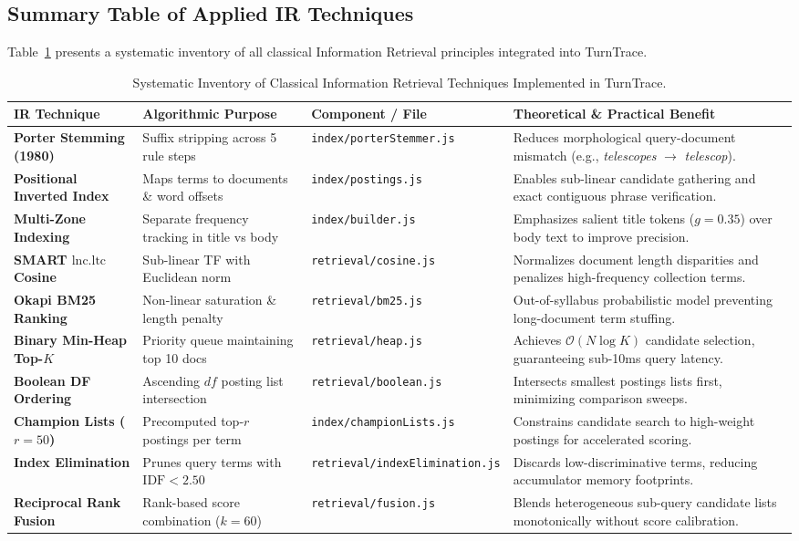 \documentclass[10pt,a4paper,twocolumn]{article}
\begin{document}
\subsection{Summary Table of Applied IR Techniques}
Table~\ref{tab:ir_techniques} presents a systematic inventory of all classical Information Retrieval principles integrated into TurnTrace.

\begin{table}[t]
\centering
\scriptsize
\caption{Systematic Inventory of Classical Information Retrieval Techniques Implemented in TurnTrace.}
\label{tab:ir_techniques}
\begin{tabularx}{\textwidth}{p{3.2cm} p{3.8cm} p{3.2cm} X}
\toprule
\textbf{IR Technique} & \textbf{Algorithmic Purpose} & \textbf{Component / File} & \textbf{Theoretical \& Practical Benefit} \\
\midrule
\textbf{Porter Stemming (1980)} & Suffix stripping across 5 rule steps & \texttt{index/porterStemmer.js} & Reduces morphological query-document mismatch (e.g., \textit{telescopes} $\to$ \textit{telescop}). \\
\textbf{Positional Inverted Index} & Maps terms to documents \& word offsets & \texttt{index/postings.js} & Enables sub-linear candidate gathering and exact contiguous phrase verification. \\
\textbf{Multi-Zone Indexing} & Separate frequency tracking in title vs body & \texttt{index/builder.js} & Emphasizes salient title tokens ($g=0.35$) over body text to improve precision. \\
\textbf{SMART $\text{lnc.ltc}$ Cosine} & Sub-linear TF with Euclidean norm & \texttt{retrieval/cosine.js} & Normalizes document length disparities and penalizes high-frequency collection terms. \\
\textbf{Okapi BM25 Ranking} & Non-linear saturation \& length penalty & \texttt{retrieval/bm25.js} & Out-of-syllabus probabilistic model preventing long-document term stuffing. \\
\textbf{Binary Min-Heap Top-$K$} & Priority queue maintaining top 10 docs & \texttt{retrieval/heap.js} & Achieves $\mathcal{O}(N \log K)$ candidate selection, guaranteeing sub-10ms query latency. \\
\textbf{Boolean DF Ordering} & Ascending $df$ posting list intersection & \texttt{retrieval/boolean.js} & Intersects smallest postings lists first, minimizing comparison sweeps. \\
\textbf{Champion Lists ($r=50$)} & Precomputed top-$r$ postings per term & \texttt{index/championLists.js} & Constrains candidate search to high-weight postings for accelerated scoring. \\
\textbf{Index Elimination} & Prunes query terms with $\text{IDF} < 2.50$ & \texttt{retrieval/indexElimination.js} & Discards low-discriminative terms, reducing accumulator memory footprints. \\
\textbf{Reciprocal Rank Fusion} & Rank-based score combination ($k=60$) & \texttt{retrieval/fusion.js} & Blends heterogeneous sub-query candidate lists monotonically without score calibration. \\
\bottomrule
\end{tabularx}
\end{table}
\end{document}
